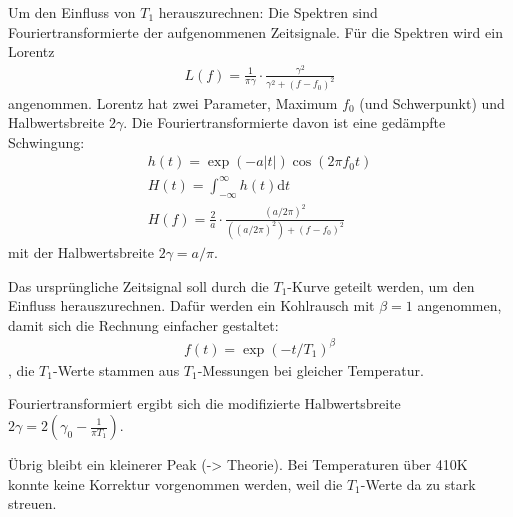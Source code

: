Um den Einfluss von $T_1$ herauszurechnen: Die Spektren sind Fouriertransformierte der aufgenommenen Zeitsignale. Für die Spektren wird ein Lorentz 
\begin{align}
    L(f) = \frac{1}{\pi \gamma} \cdot \frac{\gamma^2}{\gamma^2 + (f - f_0)^2}
\end{align}
angenommen. Lorentz hat zwei Parameter, Maximum $f_0$ (und Schwerpunkt) und Halbwertsbreite $2\gamma$. Die Fouriertransformierte davon ist eine gedämpfte Schwingung:
\begin{align}
    h(t) = \exp{(-a |t|)} \cos{(2 \pi f_0 t)} \\
    H(t) = \int_{-\infty}^{\infty} h(t) \text{d} t \\
    H(f) = \frac{2}{a} \cdot \frac{(a/2\pi)^2}{((a/2\pi)^2) + (f - f_0)^2}
\end{align}
mit der Halbwertsbreite $2 \gamma = a/\pi$.

Das ursprüngliche Zeitsignal soll durch die $T_1$-Kurve geteilt werden, um den Einfluss herauszurechnen. Dafür werden ein Kohlrausch mit $\beta = 1$ angenommen, damit sich die Rechnung einfacher gestaltet:
\begin{align}
    f(t) = \exp{(-t/T_1)^\beta}
\end{align}
, die $T_1$-Werte stammen aus $T_1$-Messungen bei gleicher Temperatur. 

Fouriertransformiert ergibt sich die modifizierte Halbwertsbreite $2\gamma = 2(\gamma_0 - \frac{1}{\pi T_1})$.

Übrig bleibt ein kleinerer Peak (-> Theorie). Bei Temperaturen über 410K konnte keine Korrektur vorgenommen werden, weil die $T_1$-Werte da zu stark streuen.

